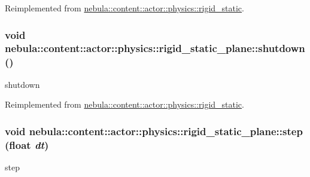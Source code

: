 Reimplemented from \hyperlink{classnebula_1_1content_1_1actor_1_1physics_1_1rigid__static_aa845026fbca4fa5967ac9d8ffcb2e10a}{nebula::content::actor::physics::rigid\_\-static}.\hypertarget{classnebula_1_1content_1_1actor_1_1physics_1_1rigid__static__plane_a2ccd43a02a417f4690bc9174e4bf533a}{
\subsubsection[{shutdown}]{\setlength{\rightskip}{0pt plus 5cm}void nebula::content::actor::physics::rigid\_\-static\_\-plane::shutdown ()}}
\label{classnebula_1_1content_1_1actor_1_1physics_1_1rigid__static__plane_a2ccd43a02a417f4690bc9174e4bf533a}


shutdown 

Reimplemented from \hyperlink{classnebula_1_1content_1_1actor_1_1physics_1_1rigid__static_acbf24424c29fa78f568f67fe80cee108}{nebula::content::actor::physics::rigid\_\-static}.\hypertarget{classnebula_1_1content_1_1actor_1_1physics_1_1rigid__static__plane_aeb2d9144ad76f92c6170bbc5ad81c2d6}{
\subsubsection[{step}]{\setlength{\rightskip}{0pt plus 5cm}void nebula::content::actor::physics::rigid\_\-static\_\-plane::step (float {\em dt})}}
\label{classnebula_1_1content_1_1actor_1_1physics_1_1rigid__static__plane_aeb2d9144ad76f92c6170bbc5ad81c2d6}


step 

